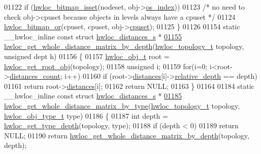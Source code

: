 \begin{DoxyCode}
01122                 \textcolor{keywordflow}{if} (\hyperlink{a00065_ga2583f44cbdb5fff2ea40efdcf3975d3f}{hwloc_bitmap_isset}(nodeset, obj->\hyperlink{a00016_a61a7a80a68eaccbaaa28269e678c81a9}{os_index}))
01123                         \textcolor{comment}{/* no need to check obj->cpuset because objects in levels
       always have a cpuset */}
01124                         \hyperlink{a00065_ga1ba1de709ee9a7cf5cc8ad2d9a1a81d4}{hwloc_bitmap_or}(cpuset, cpuset, obj->\hyperlink{a00016_a67925e0f2c47f50408fbdb9bddd0790f}{cpuset});
01125 \}
01126 
01154 \textcolor{keyword}{static} \_\_hwloc\_inline \textcolor{keyword}{const} \textcolor{keyword}{struct }\hyperlink{a00014}{hwloc_distances_s} *
\hypertarget{a00031_source_l01155}{}\hyperlink{a00063_ga48dfec8b8ba1fb8f2073ecd0728f0ca6}{01155} \hyperlink{a00063_ga48dfec8b8ba1fb8f2073ecd0728f0ca6}{hwloc_get_whole_distance_matrix_by_depth}(\hyperlink{a00039_ga9d1e76ee15a7dee158b786c30b6a6e38}{hwloc_topology_t} topology, \textcolor{keywordtype}{unsigned} dept
      h)
01156 \{
01157   \hyperlink{a00016}{hwloc_obj_t} root = \hyperlink{a00053_gadbf58f6e187efbdb3cd9a8e30311b7d7}{hwloc_get_root_obj}(topology);
01158   \textcolor{keywordtype}{unsigned} i;
01159   \textcolor{keywordflow}{for}(i=0; i<root->\hyperlink{a00016_a8be6f63eca4da91000c832280db927b7}{distances_count}; i++)
01160     \textcolor{keywordflow}{if} (root->\hyperlink{a00016_a9a5dd75596edc48fe834f81988cdc0d6}{distances}[i]->\hyperlink{a00014_a6fe066eaf62ee448aa05bab8e7217ff7}{relative_depth} == depth)
01161       \textcolor{keywordflow}{return} root->\hyperlink{a00016_a9a5dd75596edc48fe834f81988cdc0d6}{distances}[i];
01162   \textcolor{keywordflow}{return} NULL;
01163 \}
01164 
01184 \textcolor{keyword}{static} \_\_hwloc\_inline \textcolor{keyword}{const} \textcolor{keyword}{struct }\hyperlink{a00014}{hwloc_distances_s} *
\hypertarget{a00031_source_l01185}{}\hyperlink{a00063_ga9979237728f7a00a38836e15a8e8cd17}{01185} \hyperlink{a00063_ga9979237728f7a00a38836e15a8e8cd17}{hwloc_get_whole_distance_matrix_by_type}(\hyperlink{a00039_ga9d1e76ee15a7dee158b786c30b6a6e38}{hwloc_topology_t} topology, 
      \hyperlink{a00041_gacd37bb612667dc437d66bfb175a8dc55}{hwloc_obj_type_t} type)
01186 \{
01187   \textcolor{keywordtype}{int} depth = \hyperlink{a00046_gaea7c64dd59467f5201ba87712710b14d}{hwloc_get_type_depth}(topology, type);
01188   \textcolor{keywordflow}{if} (depth < 0)
01189     \textcolor{keywordflow}{return} NULL;
01190   \textcolor{keywordflow}{return} \hyperlink{a00063_ga48dfec8b8ba1fb8f2073ecd0728f0ca6}{hwloc_get_whole_distance_matrix_by_depth}(topology, depth);

\end{DoxyCode}
